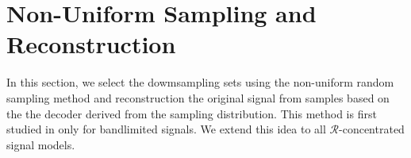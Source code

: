 \documentclass[a4paper]{article}
\newcommand{\R}{\mathcal{R}}
\theoremstyle{definition}
\begin{document}

\section{Non-Uniform Sampling and Reconstruction}


In this section, we select the dowmsampling sets using the non-uniform random sampling method and reconstruction the original signal from samples based on the the decoder derived from the sampling distribution. This method is first studied in \cite{random sampling} only for bandlimited signals. We extend this idea to all $\R$-concentrated signal models.
\end{document}
